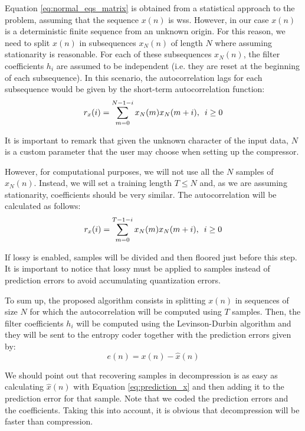 Equation \ref{eq:normal_eqs_matrix} is obtained from a statistical approach to the problem, assuming that the sequence $x(n)$ is \acrshort{wss}. However, in our case $x(n)$ is a deterministic finite sequence from an unknown origin. For this reason, we need to split $x(n)$ in subsequences $x_N(n)$ of length $N$ where assuming stationarity is reasonable. For each of these subsequences $x_N(n)$, the filter coefficients $h_i$ are assumed to be independent (i.e. they are reset at the beginning of each subsequence). In this scenario, the autocorrelation lags for each subsequence would be given by the short-term autocorrelation function:
\begin{equation}
r_x(i) = \sum_{m=0}^{N-1-i} x_N(m) x_N(m+i) ,\hspace{0.5em} i \geq 0
\end{equation}

It is important to remark that given the unknown character of the input data, $N$ is a custom parameter that the user may choose when setting up the compressor.

However, for computational purposes, we will not use all the $N$ samples of $x_N(n)$. Instead, we will set a training length $T \leq N$ and, as we are assuming stationarity, coefficients should be very similar. The autocorrelation will be calculated as follows:
\begin{equation}
	r_x(i) = \sum_{m=0}^{T-1-i} x_N(m) x_N(m+i) ,\hspace{0.5em} i \geq 0
\end{equation}

If lossy is enabled, samples will be divided and then floored just before this step. It is important to notice that lossy must be applied to samples instead of prediction errors to avoid accumulating quantization errors.

To sum up, the proposed algorithm consists in splitting $x(n)$ in sequences of size $N$ for which the autocorrelation will be computed using $T$ samples. Then, the filter coefficients $h_i$ will be computed using the Levinson-Durbin algorithm and they will be sent to the entropy coder together with the prediction errors given by:
\begin{equation}
e(n) = x(n) - \hat{x}(n)
\end{equation}

We should point out that recovering samples in decompression is as easy as calculating $\hat{x}(n)$ with Equation \ref{eq:prediction_x} and then adding it to the prediction error for that sample. Note that we coded the prediction errors and the coefficients. Taking this into account, it is obvious that decompression will be faster than compression.

